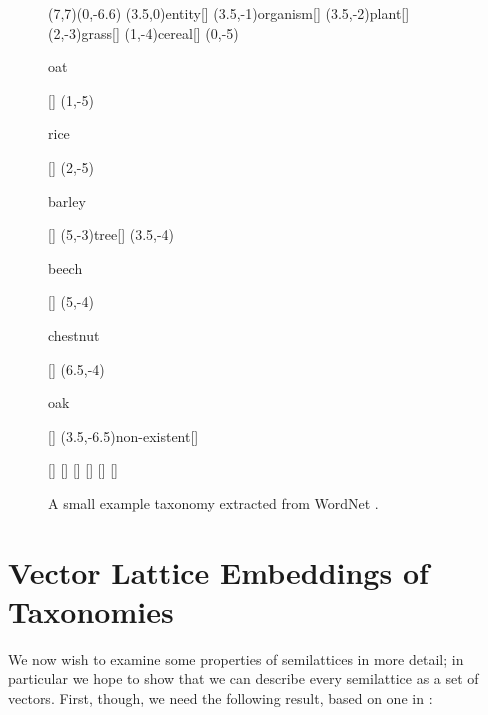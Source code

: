 \documentclass{report}
\begin{document}
\begin{figure}
\begin{center}
\begin{graph}(7,7)(0,-6.6)
(3.5,0){entity}[]
(3.5,-1){organism}[]
(3.5,-2){plant}[]
	(2,-3){grass}[]
	(1,-4){cereal}[]
		(0,-5){\rule[-0.5ex]{0pt}{2.1ex}oat}[]
		(1,-5){\rule[-0.5ex]{0pt}{2.1ex}rice}[]
		(2,-5){\rule[-0.5ex]{0pt}{2.1ex}barley}[]
	(5,-3){tree}[]
		(3.5,-4){\rule{0pt}{2ex}beech}[]
		(5,-4){\rule{0pt}{2ex}chestnut}[]
		(6.5,-4){\rule{0pt}{2ex}oak}[]
(3.5,-6.5){non-existent}[]


[]
[]
[]
[]
[]
[]

\end{graph}
\end{center}
\caption{A small example taxonomy extracted from WordNet \citep{Fellbaum:98}.}
\label{plant-taxonomy}
\end{figure}


\section{Vector Lattice Embeddings of Taxonomies}

We now wish to examine some properties of semilattices in more detail; in 
particular we hope to show that we can describe every semilattice as 
a set of vectors. First, though, we need the following result, based 
on one in \citep{Williams:90}:
\end{document}
